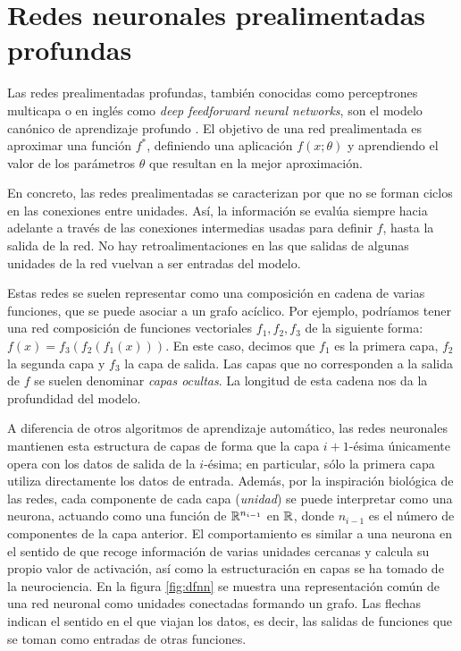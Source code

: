 \section{Redes neuronales prealimentadas
profundas}\label{redes-neuronales-prealimentadas-profundas}

\label{sec:feedforward}

Las redes prealimentadas profundas, también conocidas como perceptrones
multicapa o en inglés como \emph{deep feedforward neural networks}, son
el modelo canónico de aprendizaje profundo \autocite{goodfellow2016}. El
objetivo de una red prealimentada es aproximar una función \(f^{*}\),
definiendo una aplicación \(f(x;\theta)\) y aprendiendo el valor de los
parámetros \(\theta\) que resultan en la mejor aproximación.

En concreto, las redes prealimentadas se caracterizan por que no se
forman ciclos en las conexiones entre unidades. Así, la información se
evalúa siempre hacia adelante a través de las conexiones intermedias
usadas para definir \(f\), hasta la salida de la red. No hay
retroalimentaciones en las que salidas de algunas unidades de la red
vuelvan a ser entradas del modelo.

Estas redes se suelen representar como una composición en cadena de
varias funciones, que se puede asociar a un grafo acíclico. Por ejemplo,
podríamos tener una red composición de funciones vectoriales
\(f_1, f_2, f_3\) de la siguiente forma: \(f(x)=f_3(f_2(f_1(x)))\). En
este caso, decimos que \(f_1\) es la primera capa, \(f_2\) la segunda
capa y \(f_3\) la capa de salida. Las capas que no corresponden a la
salida de \(f\) se suelen denominar \emph{capas ocultas}. La longitud de
esta cadena nos da la profundidad del modelo.

A diferencia de otros algoritmos de aprendizaje automático, las redes
neuronales mantienen esta estructura de capas de forma que la capa
\(i+1\)-ésima únicamente opera con los datos de salida de la
\(i\)-ésima; en particular, sólo la primera capa utiliza directamente
los datos de entrada. Además, por la inspiración biológica de las redes,
cada componente de cada capa (\emph{unidad}) se puede interpretar como
una neurona, actuando como una función de \(\mathbb{R}^{n_{i-1}}\) en \(\mathbb{R}\),
donde \(n_{i-1}\) es el número de componentes de la capa anterior. El
comportamiento es similar a una neurona en el sentido de que recoge
información de varias unidades cercanas y calcula su propio valor de
activación, así como la estructuración en capas se ha tomado de la
neurociencia. En la figura \ref{fig:dfnn} se muestra una representación
común de una red neuronal como unidades conectadas formando un grafo.
Las flechas indican el sentido en el que viajan los datos, es decir, las
salidas de funciones que se toman como entradas de otras funciones.

